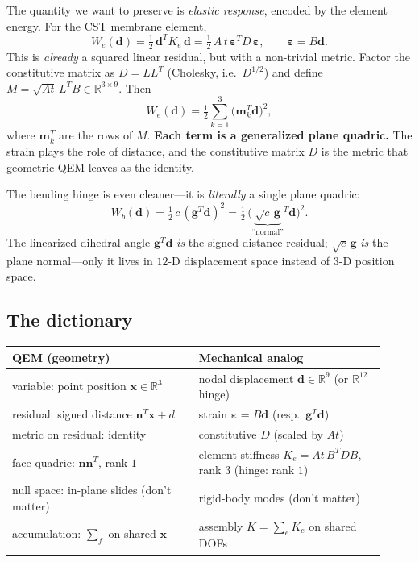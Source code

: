 The quantity we want to preserve is \emph{elastic response}, encoded by the element energy.
For the CST membrane element,
\begin{equation}
  W_e(\mathbf{d}) = \tfrac12\,\mathbf{d}^T K_e\,\mathbf{d}
                  = \tfrac12\,A\,t\,\boldsymbol\varepsilon^T D\,\boldsymbol\varepsilon,
  \qquad \boldsymbol\varepsilon = B\mathbf{d}.
\end{equation}
This is \emph{already} a squared linear residual, but with a non-trivial metric.
Factor the constitutive matrix as $D = L L^T$ (Cholesky, i.e.\ $D^{1/2}$) and define $M = \sqrt{A t}\,L^T B \in \mathbb{R}^{3\times 9}$.
Then
\begin{equation}
  W_e(\mathbf{d}) = \tfrac12\sum_{k=1}^{3}\big(\mathbf{m}_k^T\mathbf{d}\big)^2,
\end{equation}
where $\mathbf{m}_k^T$ are the rows of $M$.
\textbf{Each term is a generalized plane quadric.}
The strain plays the role of distance, and the constitutive matrix $D$ is the metric that geometric QEM leaves as the identity.

The bending hinge is even cleaner---it is \emph{literally} a single plane quadric:
\begin{equation}
  W_b(\mathbf{d}) = \tfrac12\,c\,(\mathbf{g}^T\mathbf{d})^2
                  = \tfrac12\,\big(\underbrace{\sqrt{c}\,\mathbf{g}}_{\text{``normal''}}{}^{\!T}\mathbf{d}\big)^2.
\end{equation}
The linearized dihedral angle $\mathbf{g}^T\mathbf{d}$ \emph{is} the signed-distance residual; $\sqrt{c}\,\mathbf{g}$ \emph{is} the plane normal---only it lives in $12$-D displacement space instead of $3$-D position space.

\subsection{The dictionary}

\begin{center}
\renewcommand{\arraystretch}{1.3}
\begin{tabular}{|p{0.46\linewidth}|p{0.46\linewidth}|}
\hline
\textbf{QEM (geometry)} & \textbf{Mechanical analog} \\
\hline
variable: point position $\mathbf{x}\in\mathbb{R}^3$
  & nodal displacement $\mathbf{d}\in\mathbb{R}^{9}$ (or $\mathbb{R}^{12}$ hinge) \\
\hline
residual: signed distance $\mathbf{n}^T\mathbf{x}+d$
  & strain $\boldsymbol\varepsilon = B\mathbf{d}$ (resp.\ $\mathbf{g}^T\mathbf{d}$) \\
\hline
metric on residual: identity
  & constitutive $D$ (scaled by $A t$) \\
\hline
face quadric: $\mathbf{n}\mathbf{n}^T$, rank $1$
  & element stiffness $K_e = A t\,B^T D B$, rank $3$ (hinge: rank $1$) \\
\hline
null space: in-plane slides (don't matter)
  & rigid-body modes (don't matter) \\
\hline
accumulation: $\sum_f$ on shared $\mathbf{x}$
  & assembly $K = \sum_e K_e$ on shared DOFs \\
\hline
\end{tabular}
\end{center}

